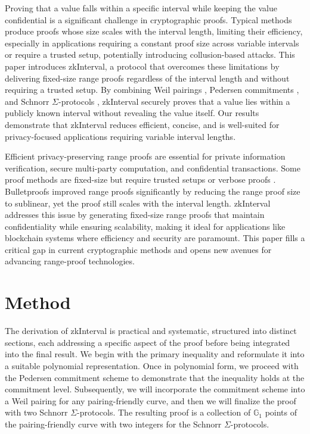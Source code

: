\documentclass[version=preprint]{iacrcc}
\begin{document}
Proving that a value falls within a specific interval while keeping the value confidential is a significant challenge in cryptographic proofs. Typical methods produce proofs whose size scales with the interval length, limiting their efficiency, especially in applications requiring a constant proof size across variable intervals or require a trusted setup, potentially introducing collusion-based attacks. This paper introduces zkInterval, a protocol that overcomes these limitations by delivering fixed-size range proofs regardless of the interval length and without requiring a trusted setup. By combining Weil pairings \cite{menezes93}, Pedersen commitments \cite{pc92}, and Schnorr $\Sigma$-protocols \cite{zero20}, zkInterval securely proves that a value lies within a publicly known interval without revealing the value itself. Our results demonstrate that zkInterval reduces efficient, concise, and is well-suited for privacy-focused applications requiring variable interval lengths.

Efficient privacy-preserving range proofs are essential for private information verification, secure multi-party computation, and confidential transactions. Some proof methods are fixed-size but require trusted setups or verbose proofs \cite{}. Bulletproofs \cite{bbb18} improved range proofs significantly by reducing the range proof size to sublinear, yet the proof still scales with the interval length. zkInterval addresses this issue by generating fixed-size range proofs that maintain confidentiality while ensuring scalability, making it ideal for applications like blockchain systems where efficiency and security are paramount. This paper fills a critical gap in current cryptographic methods and opens new avenues for advancing range-proof technologies.

\section{Method}

The derivation of zkInterval is practical and systematic, structured into distinct sections, each addressing a specific aspect of the proof before being integrated into the final result. We begin with the primary inequality and reformulate it into a suitable polynomial representation. Once in polynomial form, we proceed with the Pedersen commitment scheme to demonstrate that the inequality holds at the commitment level. Subsequently, we will incorporate the commitment scheme into a Weil pairing for any pairing-friendly curve, and then we will finalize the proof with two Schnorr $\Sigma$-protocols. The resulting proof is a collection of \(\mathbb{G}_{1}\) points of the pairing-friendly curve with two integers for the Schnorr $\Sigma$-protocols.
\end{document}
